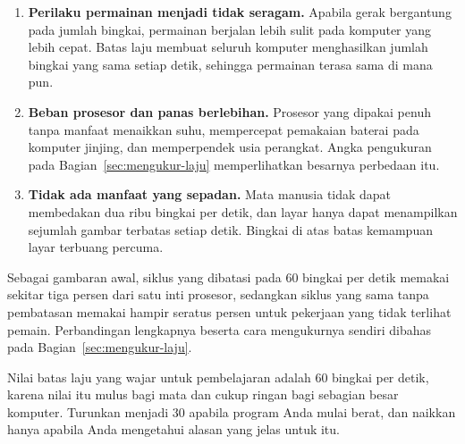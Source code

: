 \begin{enumerate}
  \item \textbf{Perilaku permainan menjadi tidak seragam.} Apabila gerak
        bergantung pada jumlah bingkai, permainan berjalan lebih sulit pada
        komputer yang lebih cepat. Batas laju membuat seluruh komputer
        menghasilkan jumlah bingkai yang sama setiap detik, sehingga
        permainan terasa sama di mana pun.
  \item \textbf{Beban prosesor dan panas berlebihan.} Prosesor yang dipakai
        penuh tanpa manfaat menaikkan suhu, mempercepat pemakaian baterai pada
        komputer jinjing, dan memperpendek usia perangkat. Angka pengukuran
        pada Bagian~\ref{sec:mengukur-laju} memperlihatkan besarnya
        perbedaan itu.
  \item \textbf{Tidak ada manfaat yang sepadan.} Mata manusia tidak dapat
        membedakan dua ribu bingkai per detik, dan layar hanya dapat
        menampilkan sejumlah gambar terbatas setiap detik. Bingkai di atas
        batas kemampuan layar terbuang percuma.
\end{enumerate}

Sebagai gambaran awal, siklus yang dibatasi pada 60 bingkai per detik memakai
sekitar tiga persen dari satu inti prosesor, sedangkan siklus yang sama tanpa
pembatasan memakai hampir seratus persen untuk pekerjaan yang tidak terlihat
pemain. Perbandingan lengkapnya beserta cara mengukurnya sendiri dibahas pada
Bagian~\ref{sec:mengukur-laju}.

\begin{tipsbox}
Nilai batas laju yang wajar untuk pembelajaran adalah 60 bingkai per detik,
karena nilai itu mulus bagi mata dan cukup ringan bagi sebagian besar
komputer. Turunkan menjadi 30 apabila program Anda mulai berat, dan
naikkan hanya apabila Anda mengetahui alasan yang jelas untuk itu.
\end{tipsbox}
